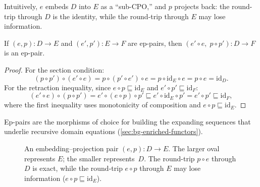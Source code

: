 Intuitively, $e$ embeds $D$ into $E$ as a ``sub-CPO,'' and $p$ projects
back: the round-trip through $D$ is the identity, while the round-trip
through $E$ may lose information.

\begin{proposition}
\label{prop:ep-pair-comp}
If $(e, p) : D \to E$ and $(e', p') : E \to F$ are ep-pairs, then
$(e' \circ e,\; p \circ p') : D \to F$ is an ep-pair.
\end{proposition}

\begin{proof}
For the section condition:
\[
  (p \circ p') \circ (e' \circ e)
    = p \circ (p' \circ e') \circ e
    = p \circ \mathrm{id}_E \circ e
    = p \circ e
    = \mathrm{id}_D.
\]
For the retraction inequality, since $e \circ p \sqsubseteq
\mathrm{id}_E$ and $e' \circ p' \sqsubseteq \mathrm{id}_F$:
\[
  (e' \circ e) \circ (p \circ p')
    = e' \circ (e \circ p) \circ p'
    \sqsubseteq e' \circ \mathrm{id}_E \circ p'
    = e' \circ p'
    \sqsubseteq \mathrm{id}_F,
\]
where the first inequality uses monotonicity of composition and
$e \circ p \sqsubseteq \mathrm{id}_E$.
\end{proof}

Ep-pairs are the morphisms of choice for building the expanding
sequences that underlie recursive domain equations
(\cref{sec:bg-enriched-functors}).

\begin{figure}[h]
\centering
{}
\caption{An embedding--projection pair $(e, p) : D \to E$.  The larger oval
  represents $E$; the smaller represents~$D$.  The round-trip
  $p \circ e$ through $D$ is exact, while the round-trip $e \circ p$
  through $E$ may lose information ($e \circ p \sqsubseteq \mathrm{id}_E$).}
\label{fig:ep-pair}
\end{figure}

